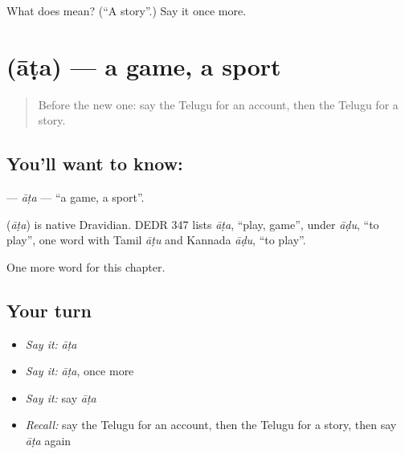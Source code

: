 \begin{tcolorbox}[breakable,colback=teal!4,colframe=teal!35!black,title={Before you move on}]
What does  mean? (\textquotedblleft{}A story\textquotedblright{}.) Say it once more.
\end{tcolorbox}
\section[\texorpdfstring{\te{ఆట} (āṭa)}{ఆట (āṭa)}]{ (āṭa) — a game, a sport}

\label{lesson:TE-C312-ata}



\begin{quote}
Before the new one: say the Telugu for an account, then the Telugu for a story.
\end{quote}

\subsection*{You'll want to know: }
\textbf{} — \emph{āṭa} — \textquotedblleft{}a game, a sport\textquotedblright{}.

\begin{cousinweb}
\textbf{} (\emph{āṭa}) is native Dravidian. DEDR 347 lists \emph{āṭa}, \textquotedblleft{}play, game\textquotedblright{}, under \emph{āḍu}, \textquotedblleft{}to play\textquotedblright{}, one word with Tamil \emph{āṭu} and Kannada \emph{āḍu}, \textquotedblleft{}to play\textquotedblright{}.
\end{cousinweb}

\begin{grammarlens}[title={What you've built}]
One more word for this chapter.
\end{grammarlens}

\subsection*{Your turn}
\begin{itemize}
\raggedright
  \item \emph{Say it:} \emph{āṭa}
  \item \emph{Say it:} \emph{āṭa}, once more
  \item \emph{Say it:} say \emph{āṭa}
  \item \emph{Recall:} say the Telugu for an account, then the Telugu for a story, then say \emph{āṭa} again
\end{itemize}

